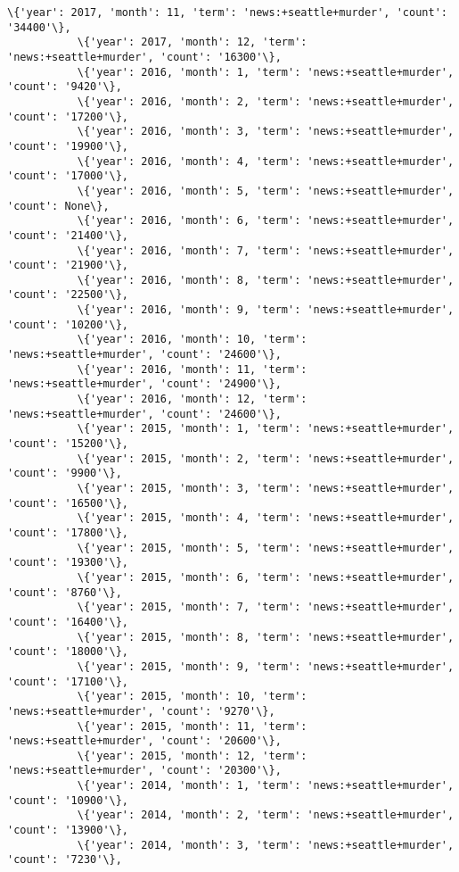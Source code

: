 \documentclass[11pt]{article}
\begin{document}
\begin{Verbatim}[commandchars=\\\{\}]
           \{'year': 2017, 'month': 11, 'term': 'news:+seattle+murder', 'count': '34400'\},
           \{'year': 2017, 'month': 12, 'term': 'news:+seattle+murder', 'count': '16300'\},
           \{'year': 2016, 'month': 1, 'term': 'news:+seattle+murder', 'count': '9420'\},
           \{'year': 2016, 'month': 2, 'term': 'news:+seattle+murder', 'count': '17200'\},
           \{'year': 2016, 'month': 3, 'term': 'news:+seattle+murder', 'count': '19900'\},
           \{'year': 2016, 'month': 4, 'term': 'news:+seattle+murder', 'count': '17000'\},
           \{'year': 2016, 'month': 5, 'term': 'news:+seattle+murder', 'count': None\},
           \{'year': 2016, 'month': 6, 'term': 'news:+seattle+murder', 'count': '21400'\},
           \{'year': 2016, 'month': 7, 'term': 'news:+seattle+murder', 'count': '21900'\},
           \{'year': 2016, 'month': 8, 'term': 'news:+seattle+murder', 'count': '22500'\},
           \{'year': 2016, 'month': 9, 'term': 'news:+seattle+murder', 'count': '10200'\},
           \{'year': 2016, 'month': 10, 'term': 'news:+seattle+murder', 'count': '24600'\},
           \{'year': 2016, 'month': 11, 'term': 'news:+seattle+murder', 'count': '24900'\},
           \{'year': 2016, 'month': 12, 'term': 'news:+seattle+murder', 'count': '24600'\},
           \{'year': 2015, 'month': 1, 'term': 'news:+seattle+murder', 'count': '15200'\},
           \{'year': 2015, 'month': 2, 'term': 'news:+seattle+murder', 'count': '9900'\},
           \{'year': 2015, 'month': 3, 'term': 'news:+seattle+murder', 'count': '16500'\},
           \{'year': 2015, 'month': 4, 'term': 'news:+seattle+murder', 'count': '17800'\},
           \{'year': 2015, 'month': 5, 'term': 'news:+seattle+murder', 'count': '19300'\},
           \{'year': 2015, 'month': 6, 'term': 'news:+seattle+murder', 'count': '8760'\},
           \{'year': 2015, 'month': 7, 'term': 'news:+seattle+murder', 'count': '16400'\},
           \{'year': 2015, 'month': 8, 'term': 'news:+seattle+murder', 'count': '18000'\},
           \{'year': 2015, 'month': 9, 'term': 'news:+seattle+murder', 'count': '17100'\},
           \{'year': 2015, 'month': 10, 'term': 'news:+seattle+murder', 'count': '9270'\},
           \{'year': 2015, 'month': 11, 'term': 'news:+seattle+murder', 'count': '20600'\},
           \{'year': 2015, 'month': 12, 'term': 'news:+seattle+murder', 'count': '20300'\},
           \{'year': 2014, 'month': 1, 'term': 'news:+seattle+murder', 'count': '10900'\},
           \{'year': 2014, 'month': 2, 'term': 'news:+seattle+murder', 'count': '13900'\},
           \{'year': 2014, 'month': 3, 'term': 'news:+seattle+murder', 'count': '7230'\},

\end{Verbatim}
\end{document}
